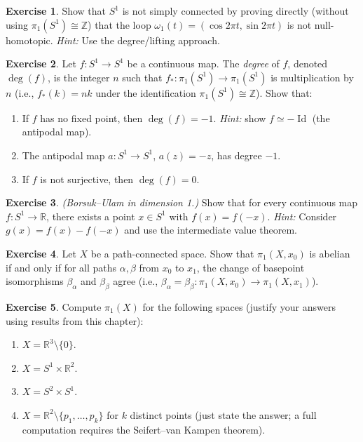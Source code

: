 \documentclass[12pt,a4paper,openany]{book}
\theoremstyle{definition}
\newtheorem{exercise}{Exercise}[chapter]
\theoremstyle{plain}
\theoremstyle{remark}
\newcommand{\Z}{\mathbb{Z}}
\newcommand{\R}{\mathbb{R}}
\DeclareMathOperator{\Id}{Id}
\begin{document}
\begin{exercise}\label{exo:ch2-3}
Show that $S^1$ is not simply connected by proving directly (without using
$\pi_1(S^1) \cong \Z$) that the loop $\omega_1(t) = (\cos 2\pi t, \sin 2\pi t)$
is not null-homotopic.
\emph{Hint:} Use the degree/lifting approach.
\end{exercise}

\begin{exercise}\label{exo:ch2-4}
Let $f \colon S^1 \to S^1$ be a continuous map. The \emph{degree} of $f$,
denoted $\deg(f)$, is the integer $n$ such that $f_* \colon \pi_1(S^1) \to
\pi_1(S^1)$ is multiplication by $n$ (i.e., $f_*(k) = nk$ under the
identification $\pi_1(S^1) \cong \Z$). Show that:
\begin{enumerate}[label=(\alph*)]
\item If $f$ has no fixed point, then $\deg(f) = -1$.
  \emph{Hint:} show $f \simeq -\Id$ (the antipodal map).
\item The antipodal map $a \colon S^1 \to S^1$, $a(z) = -z$, has degree $-1$.
\item If $f$ is not surjective, then $\deg(f) = 0$.
\end{enumerate}
\end{exercise}

\begin{exercise}\label{exo:ch2-5}
\emph{(Borsuk--Ulam in dimension 1.)} Show that for every continuous map
$f \colon S^1 \to \R$, there exists a point $x \in S^1$ with $f(x) = f(-x)$.
\emph{Hint:} Consider $g(x) = f(x) - f(-x)$ and use the intermediate value
theorem.
\end{exercise}

\begin{exercise}\label{exo:ch2-6}
Let $X$ be a path-connected space. Show that $\pi_1(X, x_0)$ is abelian if and
only if for all paths $\alpha, \beta$ from $x_0$ to $x_1$, the change of
basepoint isomorphisms $\beta_\alpha$ and $\beta_\beta$ agree (i.e., $\beta_\alpha
= \beta_\beta \colon \pi_1(X, x_0) \to \pi_1(X, x_1)$).
\end{exercise}

\begin{exercise}\label{exo:ch2-7}
Compute $\pi_1(X)$ for the following spaces (justify your answers using results
from this chapter):
\begin{enumerate}[label=(\alph*)]
\item $X = \R^3 \setminus \{0\}$.
\item $X = S^1 \times \R^2$.
\item $X = S^2 \times S^1$.
\item $X = \R^2 \setminus \{p_1, \ldots, p_k\}$ for $k$ distinct points (just
  state the answer; a full computation requires the Seifert--van Kampen
  theorem).
\end{enumerate}
\end{exercise}
\end{document}
